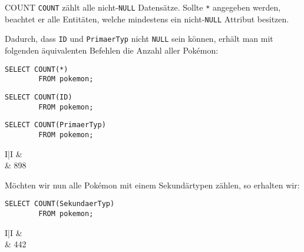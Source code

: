 \begin{sql}{COUNT}
    \texttt{COUNT} zählt alle nicht-\texttt{NULL} Datensätze.
    Sollte \texttt{*} angegeben werden, beachtet er alle Entitäten, welche mindestens ein nicht-\texttt{NULL} Attribut besitzen.

    Dadurch, dass \texttt{ID} und \texttt{PrimaerTyp} nicht \texttt{NULL} sein können, erhält man mit folgenden äquivalenten Befehlen die Anzahl aller Pokémon:

    \begin{lstlisting}[language=mysql]
        SELECT COUNT(*)
        FROM pokemon;
    \end{lstlisting}

    \begin{lstlisting}[language=mysql]
        SELECT COUNT(ID)
        FROM pokemon;
    \end{lstlisting}

    \begin{lstlisting}[language=mysql]
        SELECT COUNT(PrimaerTyp)
        FROM pokemon;
    \end{lstlisting}

    \setcounter{rownum}{0}
    \begin{tabular}{I|I}
          &  \\ & 898                          \\
    \end{tabular}
    \vspace{1em}

    Möchten wir nun alle Pokémon mit einem Sekundärtypen zählen, so erhalten wir:

    \begin{lstlisting}[language=mysql]
        SELECT COUNT(SekundaerTyp)
        FROM pokemon;
    \end{lstlisting}

    \setcounter{rownum}{0}
    \begin{tabular}{I|I}
          &  \\ & 442                                     \\
    \end{tabular}
\end{sql}

